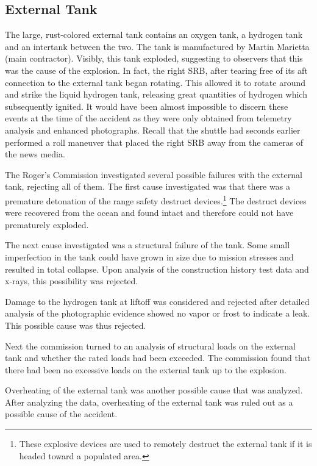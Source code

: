 \subsection{External Tank}

The large, rust-colored external tank contains an oxygen
tank, a hydrogen tank and an intertank between the two.
The tank is manufactured by Martin Marietta (main
contractor).
Visibly, this tank exploded, suggesting to observers that
this was the cause of the explosion.
In fact, the right SRB, after tearing free of its aft
connection to the external tank began rotating.
This allowed it to rotate around and strike the liquid
hydrogen tank, releasing great quantities of hydrogen which
subsequently ignited.
It would have been almost impossible to discern these events
at the time of the accident as they were only obtained from
telemetry analysis and enhanced photographs.
Recall that the shuttle had seconds earlier performed a roll
maneuver that placed the right SRB away from the cameras of
the news media.

The Roger's Commission investigated several possible
failures with the external tank, rejecting all of them.
The first cause investigated was that there was a premature
detonation of the range safety destruct
devices.\footnote{These explosive devices are used to
remotely destruct the external tank if it is headed toward a
populated area.}
The destruct devices were recovered from the ocean and found
intact and therefore could not have prematurely exploded.

The next cause investigated was a structural failure of the
tank.
Some small imperfection in the tank could have grown in size
due to mission stresses and resulted in total collapse.
Upon analysis of the construction history test data and
x-rays, this possibility was rejected.

Damage to the hydrogen tank at liftoff was considered and
rejected after detailed analysis of the photographic
evidence showed no vapor or frost to indicate a leak.
This possible cause was thus rejected.

Next the commission turned to an analysis of structural
loads on the external tank and whether the rated loads had
been exceeded.
The commission found that there had been no excessive loads
on the external tank up to the explosion.

Overheating of the external tank was another possible cause
that was analyzed.
After analyzing the data, overheating of the external tank
was ruled out as a possible cause of the accident.

